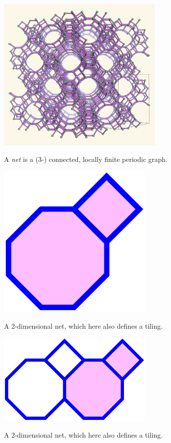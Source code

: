 \documentclass{beamer}
\begin{document}
\begin{frame}
  \begin{center}
    \includegraphics[height=3in]{fau-222}

    A {\em net} is a (3-) connected, locally finite periodic graph.
  \end{center}
\end{frame}

\begin{frame}
  \begin{center}
    \includegraphics[width=3in]{periodic1}

    A 2-dimensional net, which here also defines a tiling.
  \end{center}
\end{frame}

\begin{frame}
  \begin{center}
    \includegraphics[width=3in]{periodic2}

    A 2-dimensional net, which here also defines a tiling.
  \end{center}
\end{frame}
\end{document}
